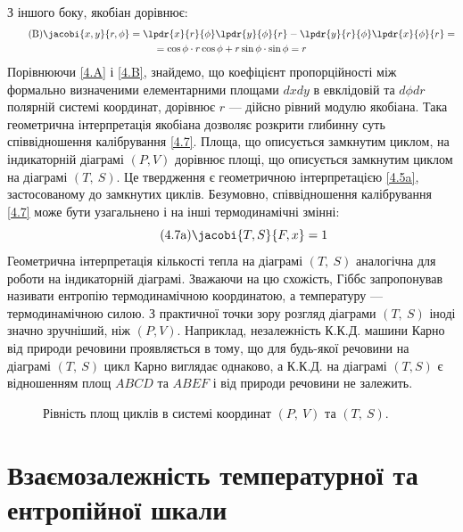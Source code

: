 З іншого боку, якобіан дорівнює:
\begin{multline}\label{4.B}\tag{B}
	\jacobi{x,y}{r,
		\phi}=\lpdr{x}{r}{\phi}\lpdr{y}{\phi}{r}-\lpdr{y}{r}{\phi}\lpdr{x}{\phi}{r}=\\
    =
    \cos\phi\cdot
	r\cos\phi+r\sin\phi\cdot\sin\phi=r
\end{multline}
Порівнюючи \eqref{4.A} і \eqref{4.B}, знайдемо, що коефіцієнт пропорційності між формально визначеними
елементарними площами $dxdy$ в евклідовій та $d\phi dr$ полярній системі координат, дорівнює $r$ ---
дійсно рівний модулю якобіана. Така геометрична інтерпретація якобіана дозволяє розкрити глибинну суть
співвідношення калібрування \eqref{4.7}. Площа, що описується замкнутим циклом, на індикаторній
діаграмі $(P,V)$ дорівнює площі, що описується замкнутим циклом на діаграмі $(T,\ S)$. Це твердження є
геометричною інтерпретацією \eqref{4.5a}, застосованому до замкнутих циклів.  Безумовно, співвідношення
калібрування \eqref{4.7} може бути узагальнено і на інші термодинамічні
змінні:
\begin{equation}\label{4.7a}\tag{4.7a}
	\jacobi{T,S}{F,x}=1
\end{equation}
Геометрична інтерпретація кількості тепла на діаграмі $(T,\ S)$ аналогічна для роботи на індикаторній
діаграмі. Зважаючи на цю схожість, Гіббс запропонував називати ентропію термодинамічною координатою, а
температуру --- термодинамічною силою. З практичної точки зору розгляд діаграми $(T,\ S)$ іноді значно
зручніший, ніж $(P,V)$. Наприклад, незалежність К.К.Д. машини Карно від природи речовини проявляється
в тому, що для будь-якої речовини на діаграмі $(T,\ S)$ цикл Карно виглядає однаково, а К.К.Д. на
діаграмі $(T,S)$ є відношенням площ $ABCD$ та $ABEF$  і від природи
речовини не залежить.

\begin{figure}[h!]\centering
    
	\caption{Рівність площ циклів в системі  координат $(P,\ V)$ та $(T,\ S)$.}
	\label{tikz:PV=TS}
\end{figure}

\section{Взаємозалежність температурної та ентропійної шкали}

